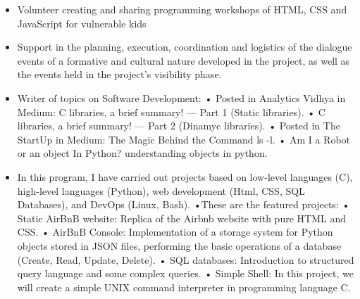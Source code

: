 \documentclass[paper=a4,fontsize=10pt,ragged2e,withhyper]{altacv}%
\begin{document}
\begin{paracol}{2}
\divider
{}
\begin{itemize}
 \item Volunteer creating and sharing programming workshops of HTML, CSS and JavaScript for vulnerable kids 
\end{itemize}
\divider
{}
\begin{itemize}
 \item Support in the planning, execution, coordination and logistics of the dialogue events of a formative and cultural nature developed in the project, as well as the events held in the project's visibility phase. 
\end{itemize}
\divider
{}
\begin{itemize}
 \item Writer of topics on Software Development:\newline%
• Posted in Analytics Vidhya in Medium: C libraries, a brief summary! — Part 1 (Static libraries).\newline%
• C libraries, a brief summary! — Part 2 (Dinamyc libraries). \newline%
• Posted in The StartUp in Medium: The Magic Behind the Command ls {-}l.\newline%
• Am I a Robot or an object In Python? understanding objects in python. 
\end{itemize}
\divider
{}
\begin{itemize}
 \item In this program, I have carried out projects based on low{-}level languages (C), high{-}level languages (Python), web development (Html, CSS, SQL Databases), and DevOps (Linux, Bash).\newline%
•These are the featured projects:\newline%
• Static AirBnB website: Replica of the Airbnb website with pure HTML and CSS.\newline%
• AirBnB Console: Implementation of a storage system for Python objects stored in JSON files, performing the basic operations of a database (Create, Read, Update, Delete).\newline%
• SQL databases: Introduction to structured query language and some complex queries.\newline%
• Simple Shell: In this project, we will create a simple UNIX command interpreter in programming language C.\newline%

\end{itemize}
\end{paracol}
\end{document}
